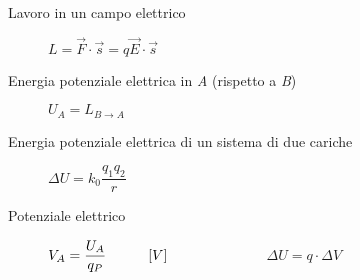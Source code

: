 \documentclass[a4paper,11pt,italian]{article}
\begin{document}
\begin{description}
  
  \item[Lavoro in un campo elettrico] 
  $ L = \vec{F} \cdot \vec{s} = q \vec{E} \cdot \vec{s}  $
  
  \item[Energia potenziale elettrica in \textit{A} (rispetto a \textit{B})] 
  $ U_A = L_{B\rightarrow A} $
  
  \item[Energia potenziale elettrica di un sistema di due cariche] 
  $  \Delta U = k_0 \dfrac{q_1 q_2}{r}  $
  
  \item[Potenziale elettrico]
  $ V_A = \dfrac{U_A}{q_P} \hspace*{3em} [V] $~~~~~~~~~~~~~~$ \Delta U = q \cdot \Delta V $   
  

\end{description}
\end{document}
